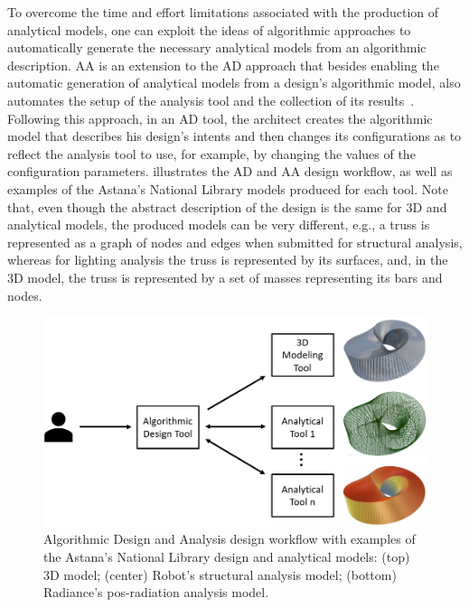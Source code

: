 	To overcome the time and effort limitations associated with the production of analytical models, one can exploit the ideas of algorithmic approaches to automatically generate the necessary analytical models from an algorithmic description. \ac{AA} is an extension to the \ac{AD} approach that besides enabling the automatic generation of analytical models from a design's algorithmic model, also automates the setup of the analysis tool and the collection of its results~\cite{Aguiar2017}. Following this approach, in an \ac{AD} tool, the architect creates the algorithmic model that describes his design's intents and then changes its configurations as to reflect the analysis tool to use, for example, by changing the values of the configuration parameters.  illustrates the \ac{AD} and \ac{AA} design workflow, as well as examples of the Astana's National Library models produced for each tool. Note that, even though the abstract description of the design is the same for 3D and analytical models, the produced models can be very different, e.g., a truss is represented as a graph of nodes and edges when submitted for structural analysis, whereas for lighting analysis the truss is represented by its surfaces, and, in the 3D model, the truss is represented by a set of masses representing its bars and nodes.

\begin{figure}[htbp]
\centering
\includegraphics[width=1\textwidth]{./Images/Introduction/AlgorithmicDesignAndAnalysis_w_models2.png}
\caption[General view of the Algorithmic Design and Analysis design approach]{Algorithmic Design and Analysis design workflow with examples of the Astana's National Library design and analytical models: (top) 3D model; (center) Robot's structural analysis model; (bottom) Radiance's pos-radiation analysis model.}
\label{fig:algorithmicanalysis}
\end{figure}		
	
